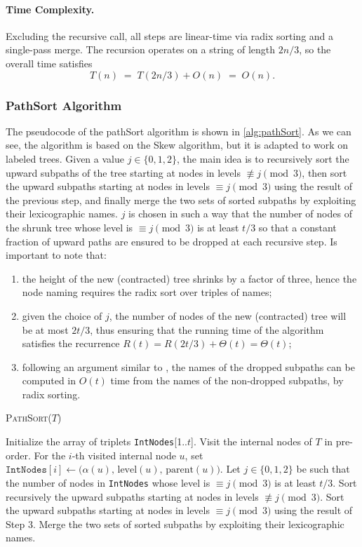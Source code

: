 \paragraph{Time Complexity.}
Excluding the recursive call, all steps are linear-time via radix sorting and a single-pass merge. The recursion operates on a string of length $2n/3$, so the overall time satisfies
\[
T(n) \;=\; T(2n/3) + O(n) \;=\; O(n).
\]

\subsubsection{PathSort Algorithm} \label{sec:pathSort}

The pseudocode of the pathSort algorithm is shown in \cref{alg:pathSort}. As we can see, the algorithm is based on the Skew algorithm, but it is adapted to work on labeled trees. 
Given a value $j\in\{0,1,2\}$, the main idea is to recursively sort the upward subpaths of the tree starting at nodes in levels $\not\equiv j \pmod{3}$, then sort the upward subpaths starting at nodes in levels $\equiv j \pmod{3}$ using the result of the previous step, and finally merge the two sets of sorted subpaths by exploiting their lexicographic names. $j$ is chosen in such a way that the number of nodes of the shrunk tree whose level is $\equiv j \pmod{3}$ is at least $t/3$ so that a constant fraction of upward paths are ensured to be dropped at each recursive step.
Is important to note that:
\begin{enumerate}
    \item the height of the new (contracted) tree shrinks by a factor of three, hence the node naming requires the radix sort over triples of names; 
    \item given the choice of $j$, the number of nodes of the new (contracted) tree will be at most $2t/3$, thus ensuring that the running time of the algorithm satisfies the recurrence $R(t) = R(2t/3) + \Theta(t) = \Theta(t)$; 
    \item following an argument similar to \cite{karkkainen2006linear}, the names of the dropped subpaths can be computed in $O(t)$ time from the names of the non-dropped subpaths, by radix sorting.
\end{enumerate}

\begin{algorithm}
    \caption{\textsc{PathSort}($T$)}
    \label{alg:pathSort}
    \begin{algorithmic}[1]
    \State Initialize the array of triplets \texttt{IntNodes}[1..$t$].
    \State Visit the internal nodes of $T$ in pre-order. For the $i$-th visited internal node $u$, set $\texttt{IntNodes}[i] \gets \bigl(\alpha(u),\, \text{level}(u),\, \text{parent}(u)\bigr)$.
    \State Let $j \in \{0, 1, 2\}$ be such that the number of nodes in \texttt{IntNodes} whose level is $\equiv j \pmod{3}$ is at least $t/3$. Sort recursively the upward subpaths starting at nodes in levels $\not\equiv j \pmod{3}$.
    \State Sort the upward subpaths starting at nodes in levels $\equiv j \pmod{3}$ using the result of Step 3.
    \State Merge the two sets of sorted subpaths by exploiting their lexicographic names.
    \end{algorithmic}
\end{algorithm}

